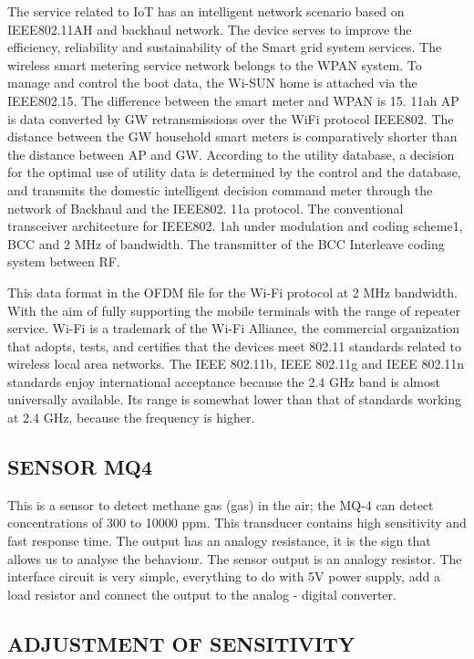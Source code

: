 \documentclass[11pt]{article}
\begin{document}
The service related to IoT has an intelligent network scenario based on IEEE802.11AH and backhaul network. The device serves to improve the efficiency, reliability and sustainability of the Smart grid system services. The wireless smart metering service network belongs to the WPAN system. To manage and control the boot data, the Wi-SUN home is attached via the IEEE802.15. The difference between the smart meter and WPAN is 15. 11ah AP is data converted by GW retransmissions over the WiFi protocol IEEE802. The distance between the GW household smart meters is comparatively shorter than the distance between AP and GW. According to the utility database, a decision for the optimal use of utility data is determined by the control and the database, and transmits the domestic intelligent decision command meter through the network of Backhaul and the IEEE802. 11a protocol. The conventional transceiver architecture for IEEE802. 1ah under modulation and coding scheme1, BCC and 2 MHz of bandwidth. The transmitter of the BCC Interleave coding system between RF.

This data format in the OFDM file for the Wi-Fi protocol at 2 MHz bandwidth. With the aim of fully supporting the mobile terminals with the range of repeater service. Wi-Fi is a trademark of the Wi-Fi Alliance, the commercial organization that adopts, tests, and certifies that the devices meet 802.11 standards related
to wireless local area networks. The IEEE 802.11b, IEEE 802.11g and IEEE 802.11n standards enjoy international acceptance because the 2.4 GHz band is almost universally available. Its range is somewhat lower than that of standards working at 2.4 GHz, because the frequency is higher.

\subsection{SENSOR MQ4}

This is a sensor to detect methane gas (gas) in the air; the MQ-4 can detect concentrations of 300 to 10000 ppm. This transducer contains high sensitivity and fast response time. The output has an analogy resistance, it is the sign that allows us to analyse the behaviour. The sensor output is an analogy resistor. The interface circuit is very simple, everything to do with 5V power supply, add a load resistor and connect the output to the analog - digital converter. 

\subsection{ADJUSTMENT OF SENSITIVITY}
\end{document}
